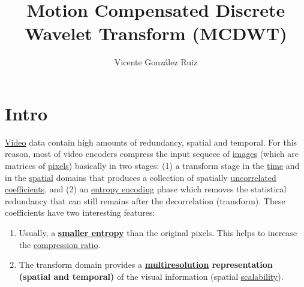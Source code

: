 
\title{Motion Compensated Discrete Wavelet Transform (MCDWT)}

\author{Vicente González Ruiz}

\maketitle
\tableofcontents

\section{Intro}

\href{https://en.wikipedia.org/wiki/Video}{Video} data contain high
amounts of redundancy, spatial and temporal. For this reason, most of
video encoders compress the input sequece of
\href{https://en.wikipedia.org/wiki/Digital_image}{images} (which are
matrices of \href{https://en.wikipedia.org/wiki/Pixel}{pixels})
basically in two stages: (1) a transform stage in the
\href{https://en.wikipedia.org/wiki/Time_domain}{time} and in the
\href{https://www.quora.com/What-is-spatial-domain-in-image-processing}{spatial}
domains that produces a collection of spatially
\href{https://en.wikipedia.org/wiki/Decorrelation}{uncorrelated}
\href{https://en.wikipedia.org/wiki/Discrete_wavelet_transform}{coefficients},
and (2) an
\href{https://en.wikipedia.org/wiki/Entropy_encoding}{entropy
  encoding} phase which removes the statistical redundancy that can
still remains after the decorrelation (transform). These coefficients
have two interesting features:
\begin{enumerate}
\item Usually, a \textbf{
  \href{https://vicente-gonzalez-ruiz.github.io/symbol_compression/}{smaller
  entropy}} than the original pixels. This helps to increase
  the \href{https://en.wikipedia.org/wiki/Data_compression_ratio}{compression
  ratio}.
\item The transform domain provides a
  \textbf{\href{https://en.wikipedia.org/wiki/Image_resolution}{multiresolution}
    representation (spatial and temporal)} of the visual information (spatial
  \href{http://inst.eecs.berkeley.edu/~ee290t/sp04/lectures/videowavelet_UCB1-3.pdf}{scalability}).
\end{enumerate}

